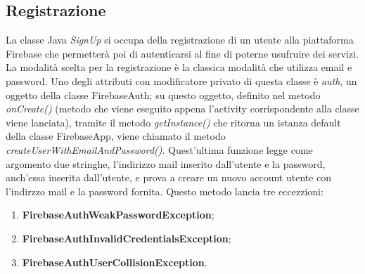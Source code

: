 \documentclass[a4paper,12pt,twoside,openright]{report}
\begin{document}
\subsection{Registrazione}
La classe Java \textit{SignUp} si occupa della registrazione di un utente alla piattaforma Firebase che permetterà poi di autenticarsi al fine di poterne usufruire dei servizi.\\
La modalità scelta per la registrazione è la classica modalità che utilizza email e password. Uno degli attributi con modificatore privato di questa classe è \textit{auth}, un oggetto della classe FirebaseAuth; su questo oggetto, definito nel metodo \textit{onCreate()} (metodo che viene eseguito appena l'activity corrispondente alla classe viene lanciata), tramite il metodo \textit{getInstance()} che ritorna un istanza default della classe FirebaseApp, viene chiamato il metodo \textit{createUserWithEmailAndPassword()}.  Quest'ultima funzione legge come argomento due stringhe, l'indirizzo mail inserito dall'utente e la password, anch'essa inserita dall'utente, e prova a creare un nuovo account utente con l'indirzzo mail e la password fornita. Questo metodo lancia tre eccezzioni:

\begin{enumerate}
\item \textbf{FirebaseAuthWeakPasswordException};

\item \textbf{FirebaseAuthInvalidCredentialsException};

\item \textbf{FirebaseAuthUserCollisionException}.
\end{enumerate}
\end{document}

